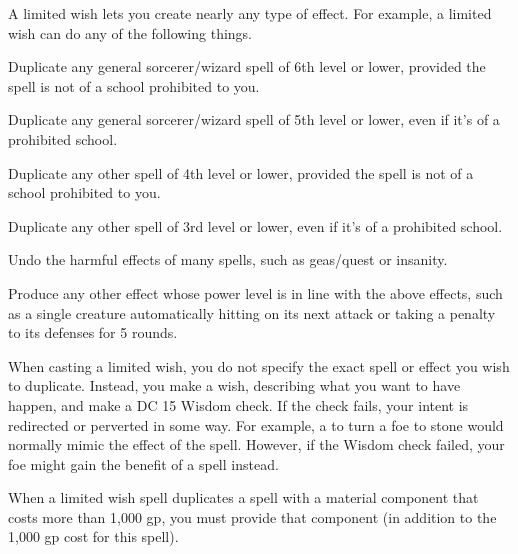 \begin{spelleffect}
  A limited wish lets you create nearly any type of effect. For example, a limited wish can do any of the following things.
  \begin{itemize*}
    \item Duplicate any general sorcerer/wizard spell of 6th level or lower, provided the spell is not of a school prohibited to you.
    \item Duplicate any general sorcerer/wizard spell of 5th level or lower, even if it's of a prohibited school.
    \item Duplicate any other spell of 4th level or lower, provided the spell is not of a school prohibited to you.
    \item Duplicate any other spell of 3rd level or lower, even if it's of a prohibited school.
    \item Undo the harmful effects of many spells, such as geas/quest or insanity.
    \item Produce any other effect whose power level is in line with the above effects, such as a single creature automatically hitting on its next attack or taking a  penalty to its defenses for 5 rounds.
  \end{itemize*}
  \par When casting a limited wish, you do not specify the exact spell or effect you wish to duplicate. Instead, you make a wish, describing what you want to have happen, and make a DC 15 Wisdom check. If the check fails, your intent is redirected or perverted in some way. For example, a  to turn a foe to stone would normally mimic the  effect of the  spell. However, if the Wisdom check failed, your foe might gain the benefit of a  spell instead.
  \par When a limited wish spell duplicates a spell with a material component that costs more than 1,000 gp, you must provide that component (in addition to the 1,000 gp cost for this spell).
\end{spelleffect}

